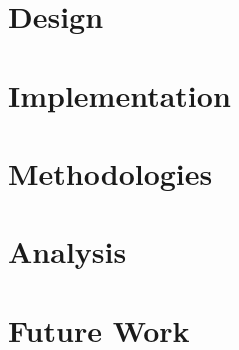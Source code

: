 \documentclass{article}
\begin{document}
  \section{Design}

  \section{Implementation}

  \section{Methodologies}

  \section{Analysis}

  \section{Future Work}

  \newpage

  \onecolumn
  
  
\end{document}
